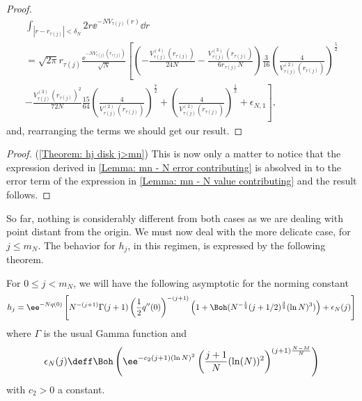 \begin{proof}
\begin{multline}
		\int_{|r - r_{\tau(j)}| < \delta_N} 2 r \ee^{-N V_{\tau(j)}(r)} \dd r  \\ = \sqrt{2\pi} r_{\tau(j)} \frac{\ee^{-N V_{\tau(j)}(r_{\tau(j)})}}{\sqrt{N}} \left[
	\left(- \frac{V^{(4)}_{\tau(j)}(r_{\tau(j)})}{24 N} - \frac{V^{(3)}_{\tau(j)}(r_{\tau(j)})}{6 r_{\tau(j)} N} \right) \frac{3}{16} \left( \frac{4}{V^{(2)}_{\tau(j)}(r_{\tau(j)})} \right)^{\frac{5}{2}} \right. \\
	\left. - \frac{V^{(3)}_{\tau(j)}(r_{\tau(j)})^2}{72 N} \frac{15}{64} \left(\frac{4}{V^{(2)}_{\tau(j)}(r_{\tau(j)})} \right)^{\frac{7}{2}} +
	\left( \frac{4}{V^{(2)}_{\tau(j)}(r_{\tau(j)})} \right)^{\frac{1}{2}} + \epsilon_{N,1} \right],
\end{multline}
and, rearranging the terms we should get our result.
\end{proof}

\begin{proof} (\autoref{Theorem: hj disk j>mn})
	This is now only a matter to notice that the expression derived in \autoref{Lemma: mn - N error contributing} is absolved in to the error term of the expression in \autoref{Lemma: mn - N value contributing} and the result follows.
\end{proof}

So far, nothing is considerably different from both cases as we are dealing with point distant from the origin. We must now deal with the more delicate case, for $j \leq m_N$. The behavior for $h_j$, in this regimen, is expressed by the following theorem.

\begin{teorema}	\label{Theorem: hj disk j<mn}
	For $0 \leq j < m_N$, we will have the following asymptotic for the norming constant
	\begin{equation}
	 h_j =  \ee^{-N q(0)} \left[ N^{-(j+1)} \Gamma(j+1)\left(\frac{1}{2} q''(0)\right)^{-(j+1)} \left( 1 + \Boh(N^{-\frac{1}{2}} (j+1/2)^{\frac{3}{2}} (\ln N)^3) \right)+ \epsilon_N(j) \right]
	\end{equation}
	where $\Gamma$ is the usual Gamma function and 
	\begin{equation}
		\epsilon_N(j) \deff \Boh\left(\ee^{-c_2 (j + 1) (\ln N)^2}  \left(\frac{j+1}{N} (\ln(N))^2 \right)^{(j+1) \frac{N-M}{N}} \right)
	\end{equation}
	with $c_2 > 0$ a constant.
\end{teorema}

